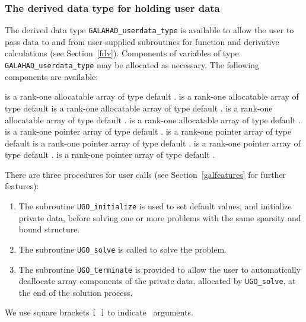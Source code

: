 \documentclass{galahad}
\newcommand{\packagename}{UGO}
\begin{document}

\subsubsection{The derived data type for holding user data}\label{typeuserdata}
The derived data type
{\tt GALAHAD\_userdata\_type}
is available to allow the user to pass data to and from user-supplied
subroutines for function and derivative calculations (see Section~\ref{fdv}).
Components of variables of type {\tt GALAHAD\_userdata\_type} may be allocated
as necessary. The following components are available:

\begin{description}
 is a rank-one allocatable array of type default \integer.
 is a rank-one allocatable array of type default  \realdp
{} is a rank-one allocatable array of type default \complexdp.
 is a rank-one allocatable array of type default \character.
 is a rank-one allocatable array of type default \logical.
 is a rank-one pointer array of type default \integer.
 is a rank-one pointer array of type default  \realdp
{} is a rank-one pointer array of type default \complexdp.
 is a rank-one pointer array of type default \character.
 is a rank-one pointer array of type default \logical.
\end{description}


\galarguments
There are three procedures for user calls
(see Section~\ref{galfeatures} for further features):

\begin{enumerate}
\item The subroutine
      {\tt \packagename\_initialize}
      is used to set default values, and initialize private data,
      before solving one or more problems with the
      same sparsity and bound structure.
\item The subroutine
      {\tt \packagename\_solve}
      is called to solve the problem.
\item The subroutine
      {\tt \packagename\_terminate}
      is provided to allow the user to automatically deallocate array
      components of the private data, allocated by
      {\tt \packagename\_solve},
      at the end of the solution process.
\end{enumerate}
We use square brackets {\tt [ ]} to indicate \optional\ arguments.
\end{document}
